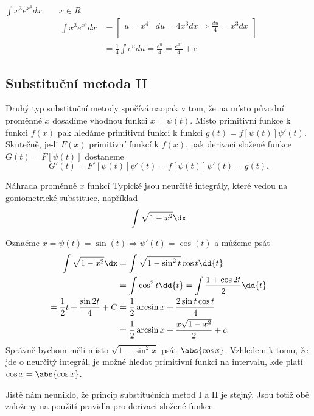       \begin{example}$\displaystyle\int{x^3e^{x^4}}dx \qquad x\in R$
        \begin{align*}
          \displaystyle\int{x^3e^{x^4}}dx
             &= 
             \left[
               \begin{array}{cc}
                  u=x^4   & du=4x^3dx \Rightarrow \displaystyle\frac{du}{4} = x^3dx  \\
               \end{array}
             \right]                                                                           \\
             &= \frac{1}{4}\int{e^u}du = \frac{e^u}{4} = \frac{e^{x^4}}{4} + c 
        \end{align*}
      \end{example}

    \subsection{Substituční metoda II}
      Druhý typ substituční metody spočívá naopak v tom, že na místo původní proměnné \(x\) 
      dosadíme vhodnou funkci \(x = \psi(t)\). Místo primitivní funkce k funkci \(f(x)\) pak 
      hledáme primitivní funkci k funkci \(g(t) = f[\psi(t)]\psi'(t)\). Skutečně, je-li \(F(x)\) 
      primitivní funkcí k \(f(x)\), pak derivací složené funkce \(G(t) = F[\psi(t)]\) dostaneme
      \begin{equation*}
       G'(t) = F'[\psi(t)]\psi'(t) = f[\psi(t)]\psi'(t) = g(t).
      \end{equation*}
      
      \begin{example} Náhrada proměnně \(x\) funkcí
        Typické jsou neurčité integrály, které vedou na goniometrické substituce, například
        \[\int\sqrt{1-x^2}\dx\]
        
        Označme \(x=\psi(t)=\sin(t)  \Rightarrow \psi'(t)=\cos(t)\) a můžeme psát
        \begin{align*}
          \int\sqrt{1-x^2}\dx 
            &= \int\sqrt{1-\sin^2t}\cos t\dd{t}                      \\
            &= \int\cos^2 t \dd{t} = \int\frac{1+\cos2t}{2}\dd{t}    \\
          = \frac{1}{2}t+\frac{\sin2t}{4}+C
            &= \frac{1}{2}\arcsin x + \frac{2\sin t\cos t}{4}        \\
            &= \frac{1}{2}\arcsin x + \frac{x\sqrt{1-x^2}}{2} + c.
        \end{align*}
        Správně bychom měli místo \(\sqrt{1 - \sin^2x}\) psát \(\abs{\cos x}\). Vzhledem k tomu, že 
        jde o neurčitý integrál, je možné hledat primitivní funkci na intervalu, kde platí \(\cos x 
        = \abs{\cos x}\).
      \end{example}
      Jistě nám neuniklo, že princip substitučních metod I a II je stejný. Jsou totiž obě založeny 
      na použití pravidla pro derivaci složené funkce.
  
